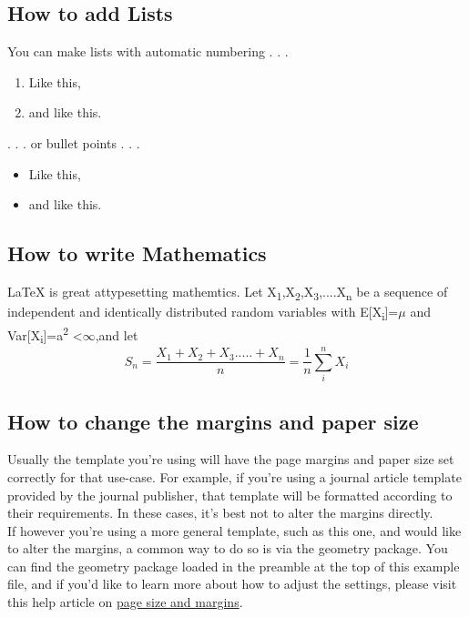 \documentclass{article}
\begin{document}
\subsection{How to add Lists}
You can make lists with automatic numbering . . .
\begin{enumerate}
	\item Like this,
	\item and like this.
\end{enumerate}
. . . or bullet points . . .
\begin{itemize}
	\item Like this,
	\item and like this.
	\end{itemize}
\subsection{How to write Mathematics}
LaTeX is great attypesetting mathemtics. Let X\textsubscript{1},X\textsubscript{2},X\textsubscript{3},....X\textsubscript{n} be a sequence of independent and identically distributed random variables with E[X\textsubscript{i}]=$\mu$ and Var[X\textsubscript{i}]=a\textsuperscript{2} \textless  $\infty$,and let
\begin{equation}
      S_n=\frac{X_1+X_2+X_3.....+X_n}{n}=\frac{1}{n} \sum_{i}^{n} X_i
\end{equation}
\subsection{How to change the margins and paper size}
Usually the template you’re using will have the page margins and paper size set correctly for that
use-case. For example, if you’re using a journal article template provided by the journal publisher,
that template will be formatted according to their requirements. In these cases, it’s best not to alter
the margins directly.\\
If however you’re using a more general template, such as this one, and would like to alter the
margins, a common way to do so is via the geometry package. You can find the geometry package
loaded in the preamble at the top of this example file, and if you’d like to learn more about how to
adjust the settings, please visit this help article on \href{https://www.overleaf.com/learn/latex/Page_size_and_margins}{page size and margins}.
\end{document}
